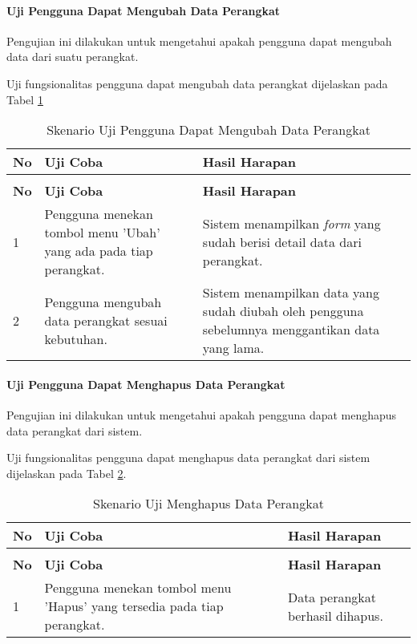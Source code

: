 \paragraph{Uji Pengguna Dapat Mengubah Data Perangkat} \label{ketiga}
Pengujian ini dilakukan untuk mengetahui apakah pengguna dapat mengubah data dari suatu perangkat.

Uji fungsionalitas pengguna dapat mengubah data perangkat dijelaskan pada Tabel \ref{ubahdata}

\begin{longtable}{|p{}|p{}|p{}|}					\caption{Skenario Uji Pengguna Dapat Mengubah Data Perangkat} \label{ubahdata} \\
	\hline
	\textbf{No} & \textbf{Uji Coba} & \textbf{Hasil Harapan} \\ \hline
	\endfirsthead
	\caption[]{Skenario Uji Pengguna Dapat Mengubah Data Perangkat} \\
	\hline
	\textbf{No} & \textbf{Uji Coba} & \textbf{Hasil Harapan} \\ \hline
	\endhead
	\endfoot
	\endlastfoot
	
	1 & Pengguna menekan tombol menu 'Ubah' yang ada pada tiap perangkat. & Sistem menampilkan \textit{form} yang sudah berisi detail data dari perangkat.\\ \hline
	2 & Pengguna mengubah data perangkat sesuai kebutuhan. & Sistem menampilkan data yang sudah diubah oleh pengguna sebelumnya menggantikan data yang lama. \\ \hline
\end{longtable}

\paragraph{Uji Pengguna Dapat Menghapus Data Perangkat} \label{keempat}
Pengujian ini dilakukan untuk mengetahui apakah pengguna dapat menghapus data perangkat dari sistem.

Uji fungsionalitas pengguna dapat menghapus data perangkat dari sistem dijelaskan pada Tabel \ref{hapusdata}.

\begin{longtable}{|p{}|p{}|p{}|}					\caption{Skenario Uji Pengguna Dapat Menghapus Data Perangkat} \label{hapusdata} \\
	\hline
	\textbf{No} & \textbf{Uji Coba} & \textbf{Hasil Harapan} \\ \hline
	\endfirsthead
	\caption[]{Skenario Uji Menghapus Data Perangkat} \\
	\hline
	\textbf{No} & \textbf{Uji Coba} & \textbf{Hasil Harapan} \\ \hline
	\endhead
	\endfoot
	\endlastfoot
	
	1 & Pengguna menekan tombol menu 'Hapus' yang tersedia pada tiap perangkat. & Data perangkat berhasil dihapus.\\ \hline
\end{longtable}

